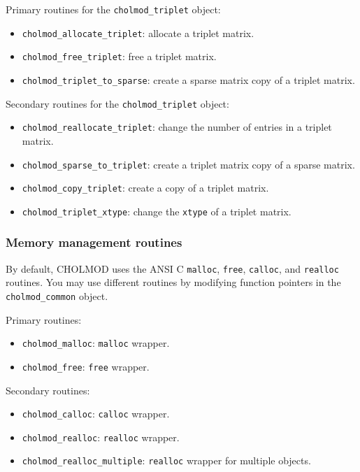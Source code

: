 \documentclass[11pt]{article}
\begin{document}
\vspace{0.1in}
\noindent Primary routines for the {\tt cholmod\_triplet} object:
    \begin{itemize}
    \item {\tt cholmod\_allocate\_triplet}: allocate a triplet matrix.
    \item {\tt cholmod\_free\_triplet}: free a triplet matrix.
    \item {\tt cholmod\_triplet\_to\_sparse}: create a sparse matrix copy of a triplet matrix.
    \end{itemize}

\noindent Secondary routines for the {\tt cholmod\_triplet} object:
    \begin{itemize}
    \item {\tt cholmod\_reallocate\_triplet}: change the number of entries in a triplet matrix.
    \item {\tt cholmod\_sparse\_to\_triplet}: create a triplet matrix copy of a sparse matrix.
    \item {\tt cholmod\_copy\_triplet}: create a copy of a triplet matrix.
    \item {\tt cholmod\_triplet\_xtype}: change the {\tt xtype} of a triplet matrix.
    \end{itemize}

\subsubsection{Memory management routines}
    By default, CHOLMOD uses the ANSI C {\tt malloc}, {\tt free},
    {\tt calloc}, and {\tt realloc} routines.  You may use different
    routines by modifying function pointers in the {\tt cholmod\_common} object.

\vspace{0.1in}
\noindent Primary routines:
    \begin{itemize}
    \item {\tt cholmod\_malloc}: {\tt malloc} wrapper.
    \item {\tt cholmod\_free}: {\tt free} wrapper.
    \end{itemize}

\noindent Secondary routines:
    \begin{itemize}
    \item {\tt cholmod\_calloc}: {\tt calloc} wrapper.
    \item {\tt cholmod\_realloc}: {\tt realloc} wrapper.
    \item {\tt cholmod\_realloc\_multiple}: {\tt realloc} wrapper for multiple objects.
    \end{itemize}
\end{document}
